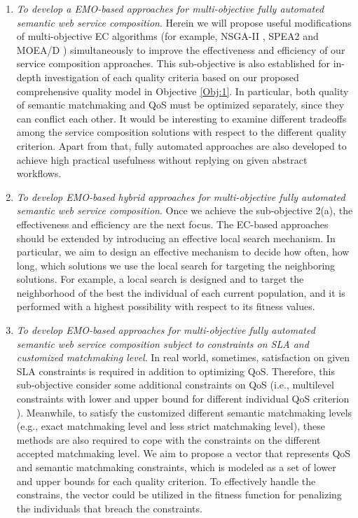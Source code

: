 \begin{enumerate}
\begin{enumerate}
    \item \label{Obj:2.1} \emph{To develop a EMO-based approaches for multi-objective fully automated semantic web service composition}. Herein we will propose useful modifications of multi-objective EC algorithms (for example, NSGA-II \cite{deb2002fast}, SPEA2 \cite{zitzler2001spea2} and MOEA/D \cite{zhang2007moea}) simultaneously to improve the effectiveness and efficiency of our service composition approaches. This sub-objective is also established for in-depth investigation of each quality criteria based on our proposed comprehensive quality model in Objective \ref{Obj:1}.  In particular, both quality of semantic matchmaking and QoS must be optimized separately, since they can conflict each other. It would be interesting to examine different tradeoffs among the service composition solutions with respect to the different quality criterion. Apart from that, fully automated approaches are also developed to achieve high practical usefulness without replying on given abstract workflows.
   
    \item \emph{To develop EMO-based hybrid approaches for multi-objective fully automated semantic web service composition}. Once we achieve the sub-objective 2(a), the effectiveness and efficiency are the next focus. The EC-based approaches should be extended by introducing an effective local search mechanism. In particular, we aim to design an effective mechanism to decide how often, how long, which solutions we use the local search for targeting the neighboring solutions. For example, a local search is designed and to target the neighborhood of the best the individual of each current population, and it is performed with a highest possibility with respect to its fitness values. 

    \item \emph{To develop EMO-based approaches for multi-objective fully automated semantic web service composition subject to constraints on SLA and customized matchmaking level}. In real world, sometimes, satisfaction on given SLA constraints is required in addition to optimizing QoS. Therefore, this sub-objective consider some additional constraints on  QoS (i.e., multilevel constraints with lower and upper bound for different individual QoS criterion \cite{yin2014hybrid}). Meanwhile, to satisfy the customized different semantic matchmaking levels (e.g., exact matchmaking level and less strict matchmaking level), these methods are also required to cope with the constraints on the different accepted matchmaking level. We aim to propose a vector that represents QoS and semantic matchmaking constraints, which is modeled as a set of lower and upper bounds for each quality criterion. To effectively handle the constrains, the vector could be utilized in the fitness function for penalizing the individuals that breach the constraints.


\end{enumerate}
\end{enumerate}
